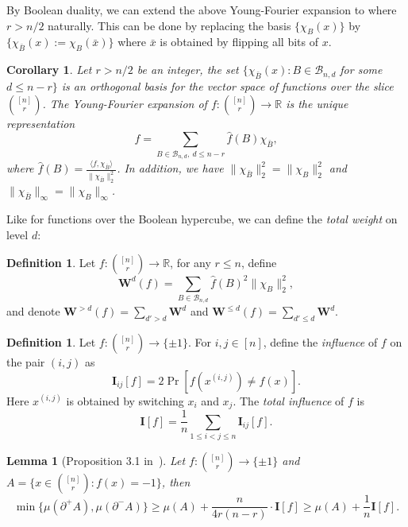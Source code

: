 \documentclass[11pt]{article}
\numberwithin{equation}{section}
\newtheorem{lemma}[theorem]{Lemma}
\newtheorem{corollary}[theorem]{Corollary}
\theoremstyle{definition}
\newtheorem{definition}[theorem]{Definition}
\theoremstyle{plain}
\newcommand{\Braket}[1]{\langle#1\rangle}
\newcommand{\W}{\mathbf{W}}
\newcommand{\I}{\mathbf{I}}
\begin{document}
By Boolean duality, we can extend the above Young-Fourier expansion to where $r>n/2$ naturally. This can be done by replacing the basis $\{\chi_B(x)\}$ by $\{\chi_{\bar{B}}(x):=\chi_B(\bar{x})\}$ where $\bar{x}$ is obtained by flipping all bits of $x$.
\begin{corollary}\label{thm:def2}
    Let $r>n/2$ be an integer, the set $\{\chi_{\bar{B}}(x):B\in \mathcal{B}_{n,d}$ for some $d\leq n-r\}$ is an orthogonal basis for the vector space of functions over the slice 
    $\binom{[n]}{r}$. %
    The Young-Fourier expansion of $f:
    \binom{[n]}{r} %
    \rightarrow \mathbb{R}$ is the unique representation
%
\begin{equation} %
f=\sum_{B\in \mathcal{B}_{n,d},\ d\leq n-r}\hat{f}(B)\chi_{\bar{B}},
%
\end{equation} %
where $\hat{f}(B)=\frac{\Braket{f,\chi_{\bar{B}}}}{\|\chi_{\bar{B}}\|_2^2}$. In addition, we have $\|\chi_{\bar{B}}\|_2^2=\|\chi_{B}\|_2^2$ and $\|\chi_{\bar{B}}\|_\infty=\|\chi_{B}\|_\infty$.
\end{corollary}

Like %
for  %
functions over the Boolean hypercube, we can define the 
%
\emph{total weight} %
on level $d$:
\begin{definition} Let $f:
%
\binom{[n]}{r} %
\rightarrow\mathbb{R}$, for any $r\leq n$, define
%
\begin{equation} %
\W^d(f) = \sum_{B\in \mathcal{B}_{n,d}}\hat{f}(B)^2\| \chi_B\|_2^2,
%
\end{equation} %
and denote $\W^{>d}(f) = \sum_{d' > d} \W^d$ and $\W^{\leq d}(f) = \sum_{d'\leq  d} \W^d$.
\end{definition}
\begin{definition}
Let $f:
%
\binom{[n]}{r} %
\rightarrow \{\pm1\}$. For $i,j\in [n]$, define the 
%
\emph{influence} %
of $f$ on the pair $(i,j)$ as
%
\begin{equation} %
\I_{ij}[f]=2\Pr[f(x^{(i,j)})\neq f(x)].
%
\end{equation} %
Here $x^{(i,j)}$ is obtained by switching $x_i$ and $x_j$.
The %
\emph{total influence} %
of $f$ is
%
\begin{equation} %
\I[f]=\frac{1}{n}\sum_{1\leq i<j\leq n}\I_{ij}[f].
%
\end{equation} %
\end{definition}
%
\begin{lemma}[Proposition 3.1 in~\cite{kkl09}]\label{key} %
    Let $f:
    \binom{[n]}{r} %
    \rightarrow \{\pm1\}$ and $A=\{x\in 
    \binom{[n]}{r}: %
    f(x)=-1\}$, then
\begin{equation} %
\min\{\mu(\partial^+ A),\mu(\partial^- A)\}\geq \mu(A)+\frac{n}{4r(n-r)}\cdot \I[f]\geq\mu(A)+\frac{1}{n}\I[f].
\end{equation} %
\end{lemma}
\end{document}
